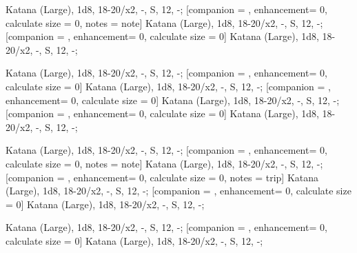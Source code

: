 {	
	\begin{Weapon}
		[companion = \ID, enhancement= 0, calculate size = 0, notes = trip] Katana (Large), 1d8, 18-20/x2, -, S, 12, -;
		[companion = \ID, enhancement= 0, calculate size = 0, notes = note] Katana (Large), 1d8, 18-20/x2, -, S, 12, -;
		[companion = \ID, enhancement= 0, calculate size = 0] Katana (Large), 1d8, 18-20/x2, -, S, 12, -;
	\end{Weapon}
}
{
	\begin{Weapon}
		[companion = \ID, enhancement= 0, calculate size = 0] Katana (Large), 1d8, 18-20/x2, -, S, 12, -;
		[companion = \ID, enhancement= 0, calculate size = 0] Katana (Large), 1d8, 18-20/x2, -, S, 12, -;
		[companion = \ID, enhancement= 0, calculate size = 0] Katana (Large), 1d8, 18-20/x2, -, S, 12, -;
		[companion = \ID, enhancement= 0, calculate size = 0] Katana (Large), 1d8, 18-20/x2, -, S, 12, -;
	\end{Weapon}
}
{
	\begin{Weapon}
		[companion = \ID, enhancement= 0, calculate size = 0, notes = trip] Katana (Large), 1d8, 18-20/x2, -, S, 12, -;
		[companion = \ID, enhancement= 0, calculate size = 0, notes = note] Katana (Large), 1d8, 18-20/x2, -, S, 12, -;
		[companion = \ID, enhancement= 0, calculate size = 0, notes = trip] Katana (Large), 1d8, 18-20/x2, -, S, 12, -;
		[companion = \ID, enhancement= 0, calculate size = 0] Katana (Large), 1d8, 18-20/x2, -, S, 12, -;
	\end{Weapon}
}
{
	\begin{Weapon}
		[companion = \ID, enhancement= 0, calculate size = 0] Katana (Large), 1d8, 18-20/x2, -, S, 12, -;
		[companion = \ID, enhancement= 0, calculate size = 0] Katana (Large), 1d8, 18-20/x2, -, S, 12, -;
	\end{Weapon}
}